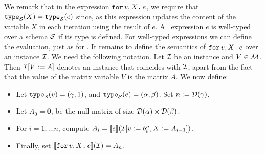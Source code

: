 %
We remark that in the expression $\texttt{for}\, v,X \texttt{.}\, e$, we require that $\texttt{type}_{\mathcal{S}}(X) = \texttt{type}_{\mathcal{S}}(e)$ since, as this expression updates the content of the variable $X$ in each iteration using the result of $e$. 
%
A \langfor\ expression $e$ is well-typed over a schema $\mathcal{S}$ if its type is defined. For well-typed expressions we can define the evaluation, just as for \lang. It remains
to define the semantics of $\texttt{for}\, v,X \texttt{.}\, e$ over an instance $\mathcal{I}$. We need the following notation. Let $\mathcal{I}$ be an instance and $V\in \mathcal{M}$. Then $\mathcal{I}[V := A]$ denotes an instance that coincides with $\mathcal{I}$, apart from the fact that the value of the matrix variable $V$ is the matrix $A$. We now define:
\begin{itemize}
\item Let $\texttt{type}_{\mathcal{S}}(v)= (\gamma,1)$, and $\texttt{type}_{\mathcal{S}}(e) = (\alpha,\beta)$. Set $n := \mathcal{D}(\gamma)$.
\item Let $A_0 = \mathbf{0}$, be the null matrix of size $\mathcal{D}(\alpha)\times \mathcal{D}(\beta)$.
\item For $i=1,\ldots n$, compute $A_i = \llbracket e \rrbracket(\mathcal{I}[v := b^{n}_i, X:= A_{i-1}])$.
\item Finally, set $\llbracket \texttt{for}\, v,X \texttt{.}\, e \rrbracket(\mathcal{I}) = A_{n}$.
\end{itemize}

